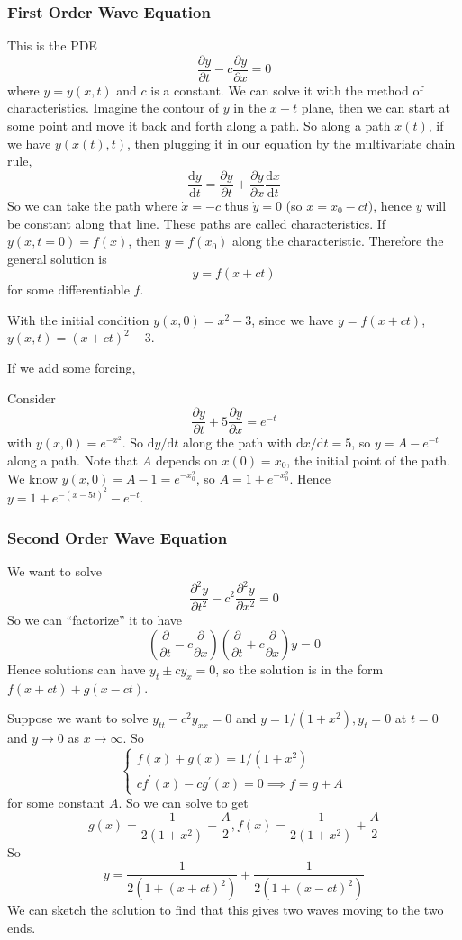 \subsubsection{First Order Wave Equation}
This is the PDE
$$\frac{\partial y}{\partial t}-c\frac{\partial y}{\partial x}=0$$
where $y=y(x,t)$ and $c$ is a constant.
We can solve it with the method of characteristics.
Imagine the contour of $y$ in the $x-t$ plane, then we can start at some point and move it back and forth along a path.
So along a path $x(t)$, if we have $y(x(t),t)$, then plugging it in our equation by the multivariate chain rule,
$$\frac{\mathrm dy}{\mathrm dt}=\frac{\partial y}{\partial t}+\frac{\partial y}{\partial x}\frac{\mathrm dx}{\mathrm dt}$$
So we can take the path where $\dot{x}=-c$ thus $\dot{y}=0$ (so $x=x_0-ct$), hence $y$ will be constant along that line.
These paths are called characteristics.
If $y(x,t=0)=f(x)$, then $y=f(x_0)$ along the characteristic.
Therefore the general solution is
$$y=f(x+ct)$$ for some differentiable $f$.
\begin{example}
    With the initial condition $y(x,0)=x^2-3$, since we have $y=f(x+ct)$, $y(x,t)=(x+ct)^2-3$.
\end{example}
If we add some forcing,
\begin{example}
    Consider
    $$\frac{\partial y}{\partial t}+5\frac{\partial y}{\partial x}=e^{-t}$$
    with $y(x,0)=e^{-x^2}$.
    So $\mathrm dy/\mathrm dt$ along the path with $\mathrm dx/\mathrm dt=5$, so $y=A-e^{-t}$ along a path.
    Note that $A$ depends on $x(0)=x_0$, the initial point of the path.
    We know $y(x,0)=A-1=e^{-x_0^2}$, so $A=1+e^{-x_0^2}$.
    Hence $y=1+e^{-(x-5t)^2}-e^{-t}$.
\end{example}
\subsubsection{Second Order Wave Equation}
We want to solve
$$\frac{\partial^2 y}{\partial t^2}-c^2\frac{\partial^2 y}{\partial x^2}=0$$
So we can ``factorize'' it to have
$$\left( \frac{\partial}{\partial t}-c\frac{\partial}{\partial x} \right)\left( \frac{\partial}{\partial t}+c\frac{\partial}{\partial x} \right)y=0$$
Hence solutions can have $y_t\pm cy_x=0$, so the solution is in the form $f(x+ct)+g(x-ct)$.
\begin{example}
    Suppose we want to solve $y_{tt}-c^2y_{xx}=0$ and $y=1/(1+x^2),y_t=0$ at $t=0$ and $y\to 0$ as $x\to\infty$.
    So
    $$\begin{cases}
        f(x)+g(x)=1/(1+x^2)\\
        cf^\prime(x)-cg^\prime(x)=0\implies f=g+A
    \end{cases}$$
    for some constant $A$.
    So we can solve to get
    $$g(x)=\frac{1}{2(1+x^2)}-\frac{A}{2},f(x)=\frac{1}{2(1+x^2)}+\frac{A}{2}$$
    So
    $$y=\frac{1}{2(1+(x+ct)^2)}+\frac{1}{2(1+(x-ct)^2)}$$
    We can sketch the solution to find that this gives two waves moving to the two ends.
\end{example}
